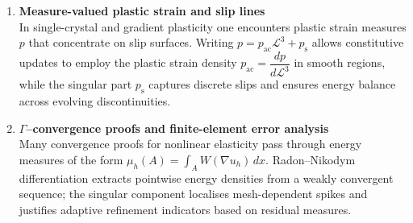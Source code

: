 \documentclass[12pt]{article}
\theoremstyle{definition} %
\theoremstyle{plain} %
\begin{document}
\begin{enumerate}
  \item \textbf{Measure-valued plastic strain and slip lines} \\
        In single-crystal and gradient plasticity one encounters plastic strain
        measures $p$ that concentrate on slip surfaces.
        Writing $p = p_{\text{ac}}\mathcal L^{3} + p_{\text{s}}$
        allows constitutive updates to employ the plastic strain
        density $p_{\text{ac}} = \dfrac{dp}{d\mathcal L^{3}}$ in smooth regions,
        while the singular part $p_{\text{s}}$ captures discrete slips and
        ensures energy balance across evolving discontinuities.

  \item \textbf{$\Gamma$–convergence proofs and finite-element error analysis} \\
        Many convergence proofs for nonlinear elasticity pass through energy
        measures of the form
        $
            \mu_h(A)=\int_A W(\nabla u_h)\,dx .
        $
        Radon–Nikodym differentiation extracts pointwise
        energy densities from a weakly convergent sequence;
        the singular component localises mesh-dependent spikes and justifies
        adaptive refinement indicators based on residual measures.
\end{enumerate}
\end{document}
